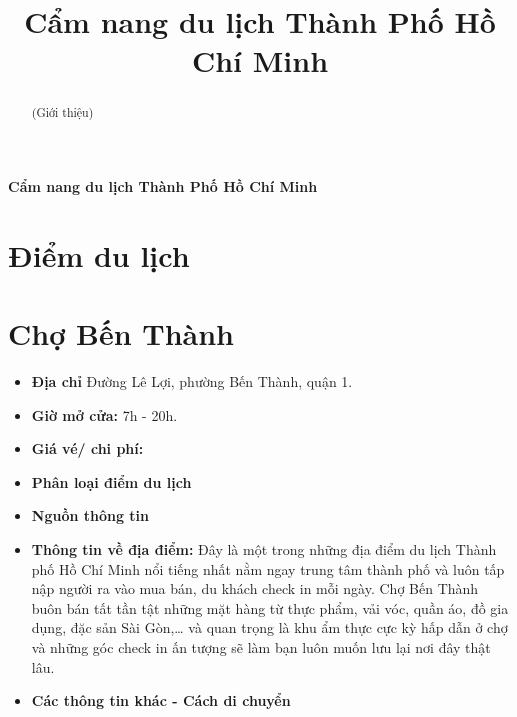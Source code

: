 \documentclass{article}
\title{Cẩm nang du lịch Thành Phố Hồ Chí Minh}
\begin{document}
\begin{center}
    \fontsize{18}{20}\textbf{Cẩm nang du lịch Thành Phố Hồ Chí Minh}
\end{center}
\begin{abstract}
    (Giới thiệu)
\end{abstract}
\section*{Điểm du lịch}

\section{Chợ Bến Thành}
\begin{itemize}
    \item{\textbf{Địa chỉ}} Đường Lê Lợi, phường Bến Thành, quận 1.
    \item{\textbf{Giờ mở cửa:}} 7h - 20h.
    \item{\textbf{Giá vé/ chi phí:}}
    \item{\textbf{Phân loại điểm du lịch}}
    \item{\textbf{Nguồn thông tin}}
    \item{\textbf{Thông tin về địa điểm:}} Đây là một trong những địa điểm du lịch Thành phố Hồ Chí Minh nổi tiếng nhất nằm ngay trung tâm thành phố và luôn tấp nập người ra vào mua bán, du khách check in mỗi ngày. Chợ Bến Thành buôn bán tất tần tật những mặt hàng từ thực phẩm, vải vóc, quần áo, đồ gia dụng, đặc sản Sài Gòn,… và quan trọng là khu ẩm thực cực kỳ hấp dẫn ở chợ và những góc check in ấn tượng sẽ làm bạn luôn muốn lưu lại nơi đây thật lâu.
\end{itemize}

\begin{itemize}
    \item{\textbf{Các thông tin khác - Cách di chuyển}}
\end{itemize}
\end{document}
